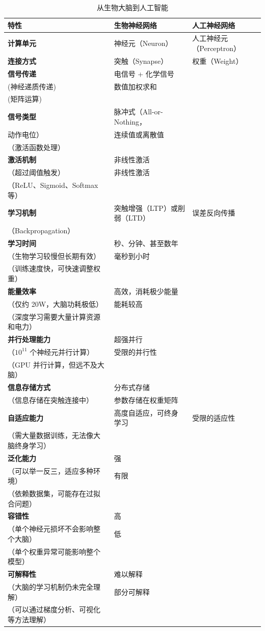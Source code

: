\begin{table}[htbp]
\centering
\caption{从生物大脑到人工智能}
\small
\begin{tabular}{|p{2.5cm}|p{5.5cm}|p{5.5cm}|}
\hline
{\bf 特性} & {\bf  生物神经网络 } & {\bf 人工神经网络}  \\
\hline
{\bf 计算单元} &  神经元（Neuron）  &  人工神经元（Perceptron）   \\
\hline
{\bf 连接方式}  &  突触（Synapse）& 权重（Weight） \\
\hline
{\bf 信号传递 }  &  电信号 + 化学信号\\(神经递质传递) &  数值加权求和\\(矩阵运算)  \\
\hline
{\bf 信号类型 }  &  脉冲式（All-or-Nothing，\\动作电位） &  连续值或离散值\\（激活函数处理）\\
\hline
{\bf 激活机制 }  &  非线性激活\\（超过阈值触发） & 非线性激活\\（ReLU、Sigmoid、Softmax 等）\\
\hline
{\bf 学习机制}  &  突触增强（LTP）或削弱（LTD）  &  误差反向传播\\（Backpropagation）\\
\hline
{\bf 学习时间}  & 秒、分钟、甚至数年\\（生物学习较慢但长期有效）& 毫秒到小时\\（训练速度快，可快速调整权重）\\
\hline
{\bf 能量效率}  & 高效，消耗极少能量\\（仅约 20W，大脑功耗极低） & 能耗较高\\（深度学习需要大量计算资源和电力）\\
\hline
{\bf 并行处理能力}  & 超强并行\\（$10^{11}$ 个神经元并行计算）& 受限的并行性\\（GPU 并行计算，但远不及大脑）\\
\hline
{\bf 信息存储方式}  & 分布式存储\\（信息存储在突触连接中） & 参数存储在权重矩阵\\
\hline
{\bf 自适应能力}  & 高度自适应，可终身学习 &  受限的适应性\\（需大量数据训练，无法像大脑终身学习）\\
\hline
{\bf 泛化能力}  &强\\（可以举一反三，适应多种环境） & 有限\\（依赖数据集，可能存在过拟合问题）\\
\hline
{\bf 容错性}  &高\\（单个神经元损坏不会影响整个大脑）  & 低\\（单个权重异常可能影响整个模型）\\
\hline
{\bf 可解释性}  & 难以解释\\（大脑的学习机制仍未完全理解） & 部分可解释\\（可以通过梯度分析、可视化等方法理解）\\
\hline
\end{tabular}
\label{从生物大脑到人工智能}
\end{table}
